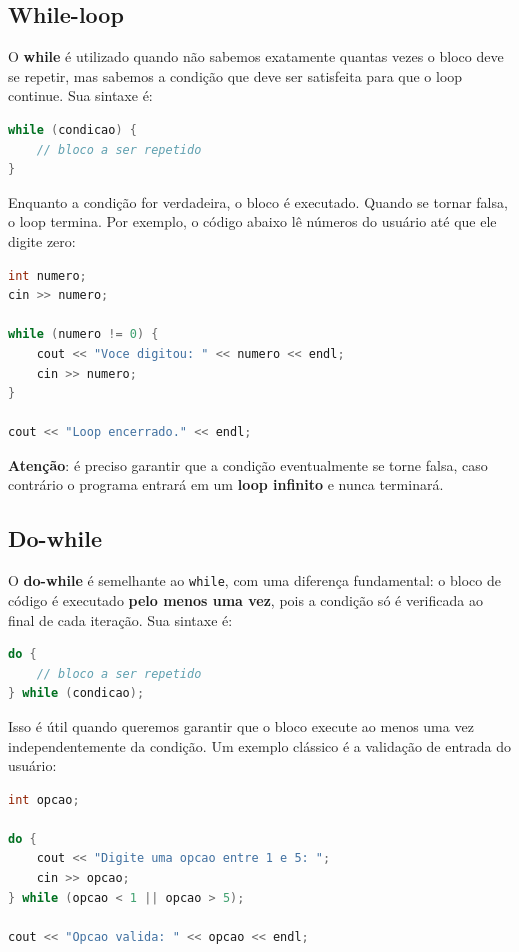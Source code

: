 \documentclass[12pt]{article}
\begin{document}
\subsection{While-loop}

O \textbf{while} é utilizado quando não sabemos exatamente quantas vezes o bloco deve se repetir, mas sabemos a condição que deve ser satisfeita para que o loop continue. Sua sintaxe é:

\begin{lstlisting}[language=C++]
while (condicao) {
    // bloco a ser repetido
}
\end{lstlisting}

Enquanto a condição for verdadeira, o bloco é executado. Quando se tornar falsa, o loop termina. Por exemplo, o código abaixo lê números do usuário até que ele digite zero:

\begin{lstlisting}[language=C++]
int numero;
cin >> numero;

while (numero != 0) {
    cout << "Voce digitou: " << numero << endl;
    cin >> numero;
}

cout << "Loop encerrado." << endl;
\end{lstlisting}

\textbf{Atenção}: é preciso garantir que a condição eventualmente se torne falsa, caso contrário o programa entrará em um \textbf{loop infinito} e nunca terminará.

\subsection{Do-while}

O \textbf{do-while} é semelhante ao \texttt{while}, com uma diferença fundamental: o bloco de código é executado \textbf{pelo menos uma vez}, pois a condição só é verificada ao final de cada iteração. Sua sintaxe é:

\begin{lstlisting}[language=C++]
do {
    // bloco a ser repetido
} while (condicao);
\end{lstlisting}

Isso é útil quando queremos garantir que o bloco execute ao menos uma vez independentemente da condição. Um exemplo clássico é a validação de entrada do usuário:

\begin{lstlisting}[language=C++]
int opcao;

do {
    cout << "Digite uma opcao entre 1 e 5: ";
    cin >> opcao;
} while (opcao < 1 || opcao > 5);

cout << "Opcao valida: " << opcao << endl;
\end{lstlisting}
\end{document}
